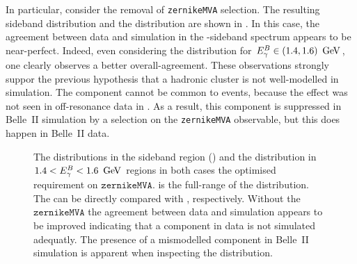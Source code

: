 In particular, consider the removal of \texttt{zernikeMVA} selection.
The resulting \EB sideband distribution and the \Mbc distribution are shown in .
In this case, the agreement between data and simulation in the \EB-sideband spectrum appears to be near-perfect.
Indeed, even considering the \Mbc distribution for ${E^B_{\gamma}}\in(1.4,1.6)~\mathrm{\,Ge\kern -0.1em V}$, one clearly observes a better overall-agreement.
These observations strongly suppor the previous hypothesis that a hadronic cluster is not well-modelled in simulation.
The component cannot be common to \epem\ra\qqbar events, because the effect was not seen in off-resonance data in .
As a result, this component is suppressed in Belle~II simulation by a selection on the \texttt{zernikeMVA} observable, but this does happen in Belle~II data.
\begin{figure}[htbp!]
    \caption{\label{fig:nozmva_test}   The \EB distributions in the \EB sideband region ()
    and the \Mbc distribution in $1.4<{E^B_{\gamma}}<1.6~\mathrm{\,Ge\kern -0.1em V}$ regions in both cases the optimised requirement on $\mathtt{zernikeMVA}$.
     is the full-range of the \ZMVA distribution.
    The  can be directly compared with , respectively.
    Without the $\mathtt{zernikeMVA}$ the agreement between data and simulation appears to be improved indicating that a component in data is not simulated adequatly.
    The presence of a mismodelled component in Belle~II simulation is apparent when inspecting the \ZMVA distribution.
    }
\end{figure}

